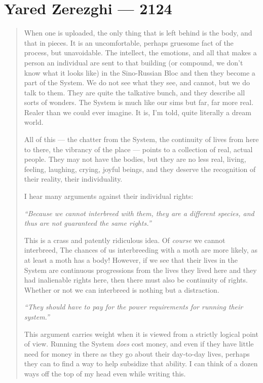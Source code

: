 \hypertarget{yared-zerezghi-2124}{%
\chapter{Yared Zerezghi — 2124}\label{yared-zerezghi-2124}}

\begin{quote}
When one is uploaded, the only thing that is left behind is the body, and that in pieces. It is an uncomfortable, perhaps gruesome fact of the process, but unavoidable. The intellect, the emotions, and all that makes a person an individual are sent to that building (or compound, we don't know what it looks like) in the Sino-Russian Bloc and then they become a part of the System. We do not see what they see, and cannot, but we do talk to them. They are quite the talkative bunch, and they describe all sorts of wonders. The System is much like our sims but far, far more real. Realer than we could ever imagine. It is, I'm told, quite literally a dream world.

All of this — the chatter from the System, the continuity of lives from here to there, the vibrancy of the place — points to a collection of real, actual people. They may not have the bodies, but they are no less real, living, feeling, laughing, crying, joyful beings, and they deserve the recognition of their reality, their individuality.

I hear many arguments against their individual rights:

\emph{``Because we cannot interbreed with them, they are a different species, and thus are not guaranteed the same rights.''}

This is a crass and patently ridiculous idea. Of \emph{course} we cannot interbreed, The chances of us interbreeding with a moth are more likely, as at least a moth has a body! However, if we see that their lives in the System are continuous progressions from the lives they lived here and they had inalienable rights here, then there must also be continuity of rights. Whether or not we can interbreed is nothing but a distraction.

\emph{``They should have to pay for the power requirements for running their system.''}

This argument carries weight when it is viewed from a strictly logical point of view. Running the System \emph{does} cost money, and even if they have little need for money in there as they go about their day-to-day lives, perhaps they can to find a way to help subsidize that ability. I can think of a dozen ways off the top of my head even while writing this.


\end{quote}
